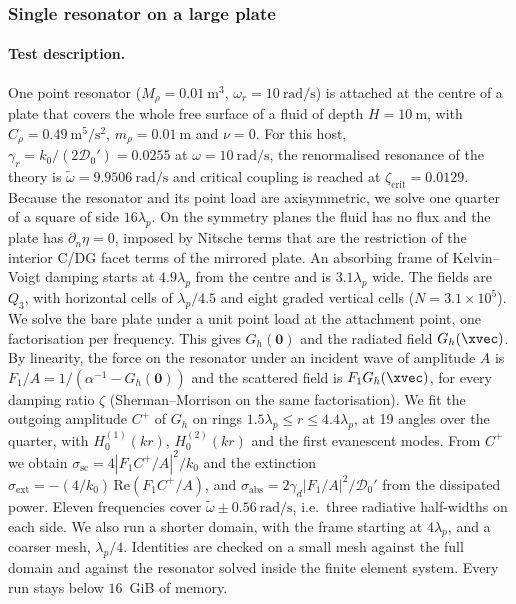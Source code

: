 {\color{red}
\subsubsection{Single resonator on a large plate}\label{subsubsec:num_L3_3}

\paragraph{Test description.} One point resonator ($M_\rho=0.01~\si{\meter\cubed}$, $\omega_r=10~\si{\radian\per\second}$) is attached at the centre of a plate that covers the whole free surface of a fluid of depth $H=10~\si{\meter}$, with $C_\rho=0.49~\si{\meter\tothe{5}\per\second\squared}$, $m_\rho=0.01~\si{\meter}$ and $\nu=0$. For this host, $\gamma_r=k_0/(2\mathcal{D}_0')=0.0255$ at $\omega=10~\si{\radian\per\second}$, the renormalised resonance of the theory is $\tilde\omega=9.9506~\si{\radian\per\second}$ and critical coupling is reached at $\zeta_\mathrm{crit}=0.0129$. Because the resonator and its point load are axisymmetric, we solve one quarter of a square of side $16\lambda_p$. On the symmetry planes the fluid has no flux and the plate has $\partial_n\eta=0$, imposed by Nitsche terms that are the restriction of the interior C/DG facet terms of the mirrored plate. An absorbing frame of Kelvin--Voigt damping starts at $4.9\lambda_p$ from the centre and is $3.1\lambda_p$ wide. The fields are $Q_3$, with horizontal cells of $\lambda_p/4.5$ and eight graded vertical cells ($N=3.1\times10^5$). We solve the bare plate under a unit point load at the attachment point, one factorisation per frequency. This gives $G_h(\bm 0)$ and the radiated field $G_h(\xvec)$. By linearity, the force on the resonator under an incident wave of amplitude $A$ is $F_1/A=1/(\alpha^{-1}-G_h(\bm 0))$ and the scattered field is $F_1G_h(\xvec)$, for every damping ratio $\zeta$ (Sherman--Morrison on the same factorisation). We fit the outgoing amplitude $C^+$ of $G_h$ on rings $1.5\lambda_p\le r\le4.4\lambda_p$, at 19 angles over the quarter, with $H_0^{(1)}(kr)$, $H_0^{(2)}(kr)$ and the first evanescent modes. From $C^+$ we obtain $\sigma_\mathrm{sc}=4|F_1C^+/A|^2/k_0$ and the extinction $\sigma_\mathrm{ext}=-(4/k_0)\,\mathrm{Re}(F_1C^+/A)$, and $\sigma_\mathrm{abs}=2\gamma_d|F_1/A|^2/\mathcal{D}_0'$ from the dissipated power. Eleven frequencies cover $\tilde\omega\pm0.56~\si{\radian\per\second}$, i.e.\ three radiative half-widths on each side. We also run a shorter domain, with the frame starting at $4\lambda_p$, and a coarser mesh, $\lambda_p/4$. Identities are checked on a small mesh against the full domain and against the resonator solved inside the finite element system. Every run stays below $16$~GiB of memory.

}
